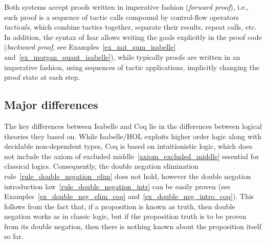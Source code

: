 \documentclass[article]{aaltoseries}
\begin{document}
Both systems accept proofs written in imperative fashion (\textit{forward proof}), i.e., such proof is a sequence of tactic calls compound by control-flow operators \textit{tacticals}, which combine tactics together, separate their results, repeat calls, etc. In addition, the syntax of Isar allows writing the goals explicitly in the proof code (\textit{backward proof}, see Examples~\ref{ex_nat_sum_isabelle} and~\ref{ex_morgan_quant_isabelle}), while typically proofs are written in an imperative fashion, using sequences of tactic applications, implicitly changing the proof state at each step.




\subsection{Major differences}

The key differences between Isabelle and Coq lie in the differences between logical theories they based on. While Isabelle/HOL exploits higher order logic along with decidable non-dependent types, Coq is based on intuitionistic logic, which does not include the axiom of excluded middle~\eqref{axiom_excluded_middle} essential for classical logics.
Consequently, the double negation elimination rule~\eqref{rule_double_negation_elim} does not hold, however the double negation introduction law~\eqref{rule_double_negation_intr} can be easily proven (see Examples~\ref{ex_double_neg_elim_coq} and~\ref{ex_double_neg_intro_coq}). This follows from the fact that, if a proposition is known as truth, then double negation works as in classic logic, but if the proposition truth is to be proven from its double negation, then there is nothing known about the proposition itself so far.
\end{document}
